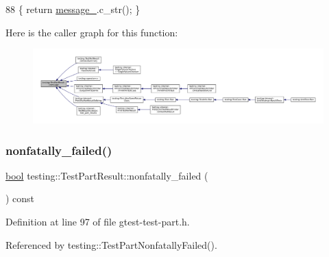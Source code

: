 \begin{DoxyCode}
88 \{ \textcolor{keywordflow}{return} \hyperlink{classtesting_1_1TestPartResult_a9adea12d4a4fb4ebf1cd00d22eac9aff}{message\_}.c\_str(); \}
\end{DoxyCode}
Here is the caller graph for this function\+:
\nopagebreak
\begin{figure}[H]
\begin{center}
\leavevmode
\includegraphics[width=350pt]{classtesting_1_1TestPartResult_a5019dc9d753aba5949777270de255d49_icgraph}
\end{center}
\end{figure}
\mbox{\label{classtesting_1_1TestPartResult_a6197c7f6672acc1cfdf580eb1f2183ac}} 
\subsubsection{\texorpdfstring{nonfatally\+\_\+failed()}{nonfatally\_failed()}}
{\footnotesize\ttfamily \hyperlink{classbool}{bool} testing\+::\+Test\+Part\+Result\+::nonfatally\+\_\+failed (\begin{DoxyParamCaption}{ }\end{DoxyParamCaption}) const\hspace{0.3cm}{\ttfamily [inline]}}



Definition at line 97 of file gtest-\/test-\/part.\+h.



Referenced by testing\+::\+Test\+Part\+Nonfatally\+Failed().


